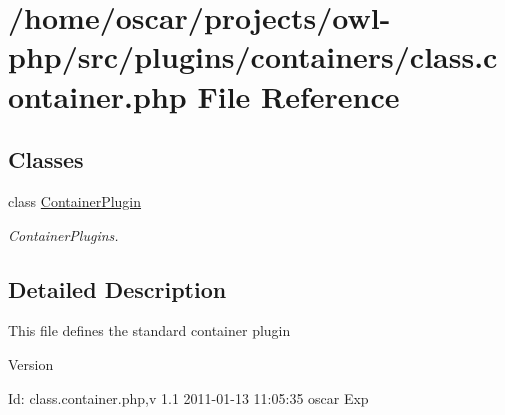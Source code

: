 \section{/home/oscar/projects/owl-\/php/src/plugins/containers/class.container.php File Reference}
\label{plugins_2containers_2class_8container_8php}
\subsection*{Classes}
\begin{DoxyCompactItemize}
\item 
class \hyperlink{classContainerPlugin}{ContainerPlugin}
\begin{DoxyCompactList}\small\item\em ContainerPlugins. \item\end{DoxyCompactList}\end{DoxyCompactItemize}


\subsection{Detailed Description}
This file defines the standard container plugin \begin{DoxyVersion}{Version}

\end{DoxyVersion}
\begin{DoxyParagraph}{Id:}
class.container.php,v 1.1 2011-\/01-\/13 11:05:35 oscar Exp 
\end{DoxyParagraph}
